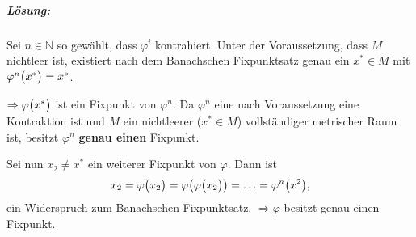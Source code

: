 \documentclass{scrreprt}
\begin{document}
\subparagraph{Lösung:} Sei $n \in \mathbb{N}$ so gewählt, dass $\varphi^i$
kontrahiert.
Unter der Voraussetzung, dass $M$ nichtleer ist, existiert nach dem Banachschen
Fixpunktsatz genau ein $x^* \in M$ mit $\varphi^n\qty\big(x^*) = x^*$.
$\Rightarrow \varphi\qty\big(x^*)$ ist ein Fixpunkt von $\varphi^n$.
Da $\varphi^n$ eine nach Voraussetzung eine Kontraktion ist und $M$
ein nichtleerer ($x^* \in M$) vollständiger metrischer Raum ist, besitzt
$\varphi^n$ \textbf{genau einen} Fixpunkt.
Sei nun $x_2 \ne x^*$ ein weiterer Fixpunkt von $\varphi$. Dann ist
\[
  x_2 = \varphi\qty\big(x_2) = \varphi\qty\big(\varphi\qty\big(x_2))
  = \ldots = \varphi^n\qty\big(x^2),
\]
ein Widerspruch zum Banachschen Fixpunktsatz.
$\Rightarrow \varphi$ besitzt genau einen Fixpunkt.
\end{document}
